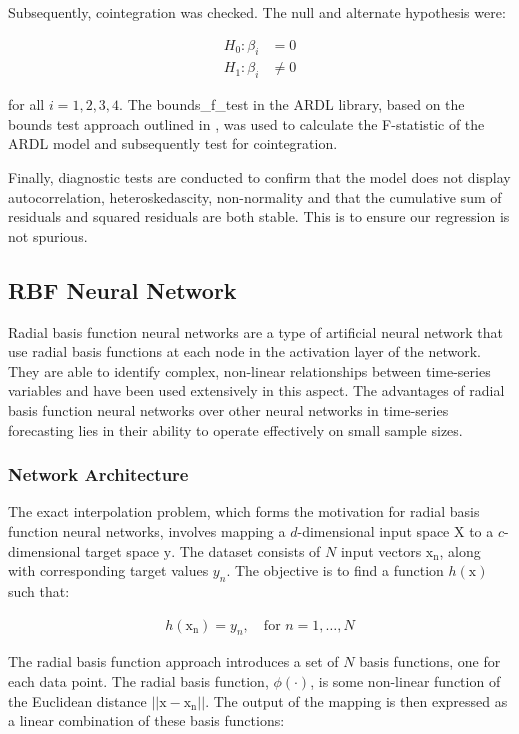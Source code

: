\documentclass[11pt,a4paper]{article}
\newcommand{\citeboth}[1]{\citeauthor{#1} \citep{#1}}
\begin{document}
Subsequently, cointegration was checked. The null and alternate hypothesis were:

\begin{align*}
    H_{0}: \beta_i &= 0\\
    H_{1}: \beta_i &\neq 0
\end{align*}

for all $i = 1,2,3,4$. The bounds\_f\_test in 
the ARDL library, based on the bounds test approach 
outlined in \citeboth{pesaran2001}, was used to calculate the 
F-statistic of the ARDL model and subsequently test for cointegration.

Finally, diagnostic tests are conducted to confirm that the model does not
display autocorrelation, heteroskedascity, non-normality and that the cumulative 
sum of residuals and squared residuals are both stable. This is to 
ensure our regression is not spurious.

\subsection{RBF Neural Network}

Radial basis function neural networks are a type of artificial 
neural network that use radial basis functions at each node in the 
activation layer of the network. They are able to identify complex, 
non-linear relationships between time-series variables and have been used
extensively in this aspect. The advantages of radial basis function neural networks over other 
neural networks in time-series forecasting lies in their 
ability to operate effectively on small sample sizes.

\subsubsection{Network Architecture}
The exact interpolation problem, which forms the motivation for radial basis function neural networks, 
involves mapping a $d$-dimensional input space $\boldsymbol{\mathrm{X}}$ to
a $c$-dimensional target space $\boldsymbol{\mathrm{y}}$. The dataset consists of $N$ input
vectors $\boldsymbol{\mathrm{x_n}}$, along with corresponding target 
values $y_n$. The objective is to find a function
  $h(\boldsymbol{\mathrm{x}})$ such that:


\begin{align}
  h(\boldsymbol{\mathrm{x_n}}) = y_n, \quad \text{for } n = 1, \ldots, N
\end{align}

The radial basis function approach 
introduces a set of $N$ basis functions, one for each 
data point. The radial basis function, $\phi(\cdot)$, is some non-linear function of the Euclidean distance
$||\boldsymbol{\mathrm{x}} - \boldsymbol{\mathrm{x_n}}||$. The output of the mapping is then expressed as a linear combination of these basis functions:
\end{document}
